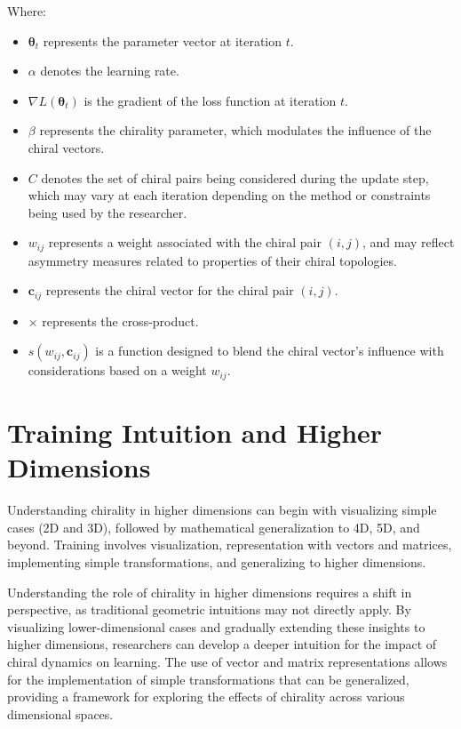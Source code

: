 \documentclass[12pt, a4paper]{article}
\begin{document}
Where:
\begin{itemize}
    \item \(\boldsymbol{\theta}_t\) represents the parameter vector at iteration \(t\).
    \item \(\alpha\) denotes the learning rate.
    \item \(\nabla L(\boldsymbol{\theta}_t)\) is the gradient of the loss function at iteration \(t\).
    \item \(\beta\) represents the chirality parameter, which modulates the influence of the chiral vectors.
    \item \(C\) denotes the set of chiral pairs being considered during the update step, which may vary at each iteration depending on the method or constraints being used by the researcher.
    \item \(w_{ij}\) represents a weight associated with the chiral pair \((i,j)\), and may reflect asymmetry measures related to properties of their chiral topologies.
    \item \(\mathbf{c}_{ij}\) represents the chiral vector for the chiral pair \((i, j)\).
    \item \(\times\) represents the cross-product.
    \item \(s(w_{ij},\mathbf{c}_{ij})\) is a function designed to blend the chiral vector's influence with considerations based on a weight \(w_{ij}\).
\end{itemize}

\section{Training Intuition and Higher Dimensions}
Understanding chirality in higher dimensions can begin with visualizing simple cases (2D and 3D), followed by mathematical generalization to 4D, 5D, and beyond. Training involves visualization, representation with vectors and matrices, implementing simple transformations, and generalizing to higher dimensions.

Understanding the role of chirality in higher dimensions requires a shift in perspective, as traditional geometric intuitions may not directly apply. By visualizing lower-dimensional cases and gradually extending these insights to higher dimensions, researchers can develop a deeper intuition for the impact of chiral dynamics on learning. The use of vector and matrix representations allows for the implementation of simple transformations that can be generalized, providing a framework for exploring the effects of chirality across various dimensional spaces.
\end{document}
